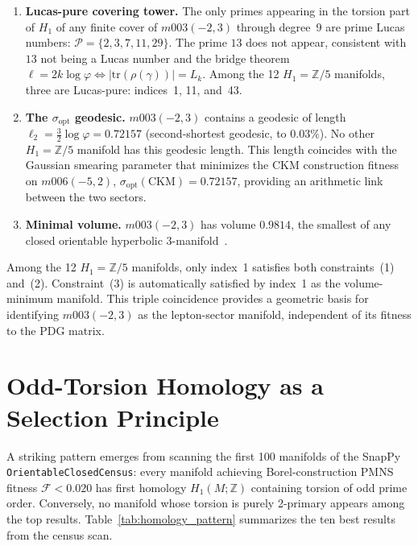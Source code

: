 \documentclass[11pt,a4paper]{article}
\begin{document}
\begin{enumerate}
\item \textbf{Lucas-pure covering tower.}
  The only primes appearing in the torsion part of $H_1$ of any finite
  cover of $m003(-2,3)$ through degree~9 are prime Lucas numbers:
  $\mathcal{P} = \{2, 3, 7, 11, 29\}$.
  The prime $13$ does not appear, consistent with $13$ not being a
  Lucas number and the bridge theorem $\ell = 2k\log\varphi
  \Leftrightarrow |\mathrm{tr}(\rho(\gamma))| = L_k$.
  Among the 12 $H_1 = \mathbb{Z}/5$ manifolds, three are Lucas-pure:
  indices~1, 11, and~43.

\item \textbf{The $\sigma_{\mathrm{opt}}$ geodesic.}
  $m003(-2,3)$ contains a geodesic of length
  $\ell_2 = \tfrac{3}{2}\log\varphi = 0.72157$
  (second-shortest geodesic, to $0.03\%$).
  No other $H_1 = \mathbb{Z}/5$ manifold has this geodesic length.
  This length coincides with the Gaussian smearing parameter that
  minimizes the CKM construction fitness on $m006(-5,2)$,
  $\sigma_{\mathrm{opt}}(\mathrm{CKM}) = 0.72157$, providing an
  arithmetic link between the two sectors.

\item \textbf{Minimal volume.}
  $m003(-2,3)$ has volume $0.9814$, the smallest of any closed
  orientable hyperbolic 3-manifold~\cite{GMM}.
\end{enumerate}

Among the 12 $H_1 = \mathbb{Z}/5$ manifolds, only index~1
satisfies both constraints~(1) and~(2). Constraint~(3) is
automatically satisfied by index~1 as the volume-minimum manifold.
This triple coincidence provides a geometric basis for identifying
$m003(-2,3)$ as the lepton-sector manifold, independent of its
fitness to the PDG matrix.

\section{Odd-Torsion Homology as a Selection Principle}
\label{sec:homology}

A striking pattern emerges from scanning the first 100 manifolds of
the SnapPy \texttt{OrientableClosedCensus}: every manifold achieving
Borel-construction PMNS fitness $\mathcal{F} < 0.020$ has first
homology $H_1(M;\mathbb{Z})$ containing torsion of odd prime order.
Conversely, no manifold whose torsion is purely 2-primary appears
among the top results. Table~\ref{tab:homology_pattern} summarizes
the ten best results from the census scan.
\end{document}
